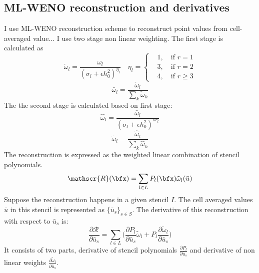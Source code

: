 \subsection{ML-WENO reconstruction and derivatives}
I use ML-WENO reconstruction scheme to reconstruct point values
from cell-averaged value...
I use two stage non linear weighting. The first stage is
calculated as
\begin{equation}\label{eq:fstage}
		  \check \omega_l = \frac{\omega_l}{(\sigma_l + \epsilon h^2_0)^{\eta_l}} 
		  \quad \eta_l = \left \{\begin{aligned}
					 &1, \quad \text{if } r=1\\
					 &3, \quad \text{if } r=2\\
					 &4, \quad \text{if } r\geq 3
		  \end{aligned}
		  \right .
\end{equation}
\begin{equation}\label{eq:fstagenorm}
		  \bar \omega_l = \frac{\check \omega_l}{\sum_k \check \omega_k}
\end{equation}
The the second stage is calculated based on first stage:
\begin{equation}\label{eq:sstage}
		  \hat \omega_l = \frac{\bar \omega_l}{(\sigma_l + \epsilon h^2_0)^{sr_l}}
\end{equation}
\begin{equation}\label{eq:sstagenorm}
		  \tilde \omega_l = \frac{\hat \omega_l}{\sum_k \hat \omega_k}
\end{equation}
The reconstruction is expressed as the weighted linear combination of 
stencil polynomials.
\begin{equation}\label{eq:weno}
		  \mathscr{R}(\bfx) = \sum_{l\in L} P_l(\bfx) \tilde\omega_l(\bar u)
\end{equation}
Suppose the reconstruction happens in a given stencil $I$. 
The cell averaged values $\bar u$ in this stencil is represented as $\{\bar u_s\}_{s \in S}$.
The derivative of this reconstruction with respect to $\bar u_s$ is:
\begin{equation}\label{eq:derivR}
		  \frac{\partial \mathscr{R}}{\partial \bar u_s} = 
		  \sum_{l \in L} \Big(\frac{\partial P_l}{\partial \bar u_s}\tilde \omega_l + P_l\frac{\partial \tilde \omega_l}{\partial \bar u_s}\Big) 
\end{equation}
It consists of two parts, derivative of stencil polynomials $\frac{\partial P_l}{\partial \bar u_s}$ and 
derivative of non linear weights $\frac{\partial \tilde \omega_l}{\partial \bar u_s}$.
